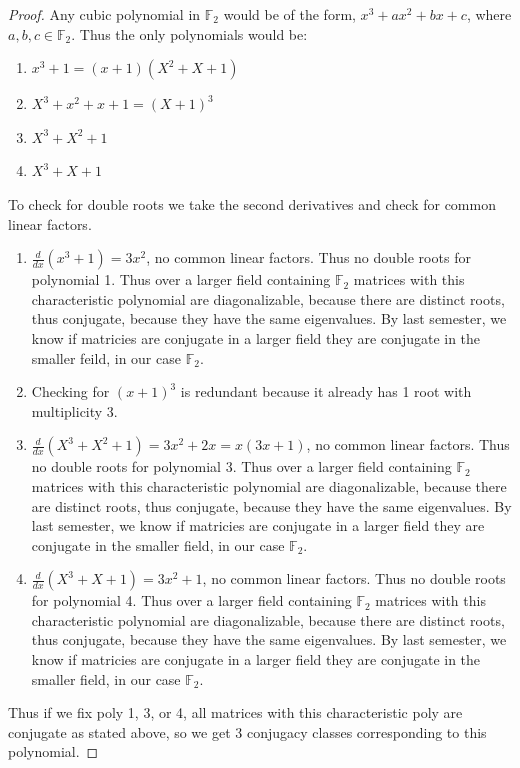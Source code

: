 \documentclass{article}
\newcommand*{\F}{\mathbb{F}}
\begin{document}
\begin{proof}
    Any cubic polynomial in $\F_2$  would be of the form, $x^3 + ax^2 + bx + c$, where $a, b, c \in \F_2$. Thus the only polynomials would be:
    
    \begin{enumerate}
        \item $x^3 + 1 = (x +1)(X^2 + X + 1)$
        \item $X^3 + x^2 + x + 1 = (X + 1)^3$
        \item $X^3 + X^2 + 1$ 
        \item $X^3 + X + 1$ 
    \end{enumerate}
    

    To check for double roots we take the second derivatives and check for common linear factors.
     
    
    \begin{enumerate}
        \item $\frac{d}{dx}(x^3 + 1) = 3x^2$, no common linear factors. Thus no double roots for polynomial 1. Thus over a larger field containing $\F_2$  matrices with this characteristic polynomial are diagonalizable, because there are distinct roots, thus conjugate, because they have the same eigenvalues. By last semester, we know if matricies are conjugate in a larger field they are conjugate in the smaller feild, in our case $\F_2$. 
        \item Checking for $(x + 1)^3$ is redundant because it already has 1 root with multiplicity 3.
        \item $\frac{d}{dx}(X^3 + X^2 + 1) = 3x^2 + 2x = x(3x + 1)$, no common linear factors. Thus no double roots for polynomial 3. Thus over a larger field containing $\F_2$  matrices with this characteristic polynomial are diagonalizable, because there are distinct roots, thus conjugate, because they have the same eigenvalues. By last semester, we know if matricies are conjugate in a larger field they are conjugate in the smaller field, in our case $\F_2$.
        \item $\frac{d}{dx}(X^3 + X + 1) = 3x^2 + 1 $, no common linear factors. Thus no double roots for polynomial 4. Thus over a larger field containing $\F_2$  matrices with this characteristic polynomial are diagonalizable, because there are distinct roots, thus conjugate, because they have the same eigenvalues. By last semester, we know if matricies are conjugate in a larger field they are conjugate in the smaller field, in our case $\F_2$.
    \end{enumerate}
    
    Thus if we fix poly 1, 3, or 4, all matrices with this characteristic poly are conjugate as stated above, so we get 3 conjugacy classes corresponding to this polynomial. 
\end{proof}
\end{document}
